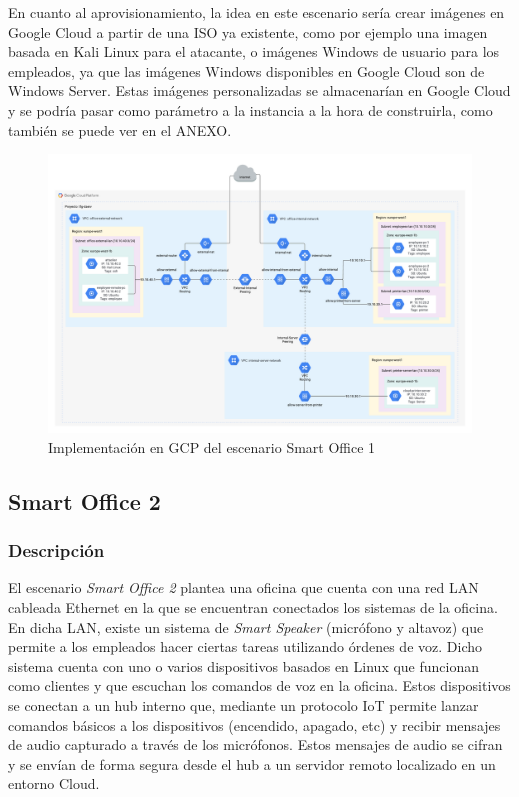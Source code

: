   En cuanto al aprovisionamiento, la idea en este escenario sería crear imágenes en Google Cloud a partir de una ISO ya existente, como por ejemplo una imagen basada en Kali Linux para el atacante, o imágenes Windows de usuario para los empleados, ya que las imágenes Windows disponibles en Google Cloud son de Windows Server. Estas imágenes personalizadas se almacenarían en Google Cloud y se podría pasar como parámetro a la instancia a la hora de construirla, como también se puede ver en el ANEXO.

  \clearpage
  \begin{figure}[h]
  \centering
  \includegraphics[width=1.45\textwidth, angle=270]{../imgs/desarrollo/escenarios-de-red/smart-office-1/EscenarioSmartOffice1V2.png}
  \caption{Implementación en GCP del escenario Smart Office 1}
  \label{fig:so1-i}
  \end{figure}
  \clearpage 

\subsection{Smart Office 2} \label{sec:so2}
\subsubsection{Descripción}
  El escenario \textit{Smart Office 2} plantea una oficina que cuenta con una red LAN cableada Ethernet en la que se encuentran conectados los sistemas de la oficina. En dicha LAN, existe un sistema de \textit{Smart Speaker} (micrófono y altavoz) que permite a los empleados hacer ciertas tareas utilizando órdenes de voz. Dicho sistema cuenta con uno o varios dispositivos basados en Linux que funcionan como clientes y que escuchan los comandos de voz en la oficina. Estos dispositivos se conectan a un hub interno que, mediante un protocolo IoT permite lanzar comandos básicos a los dispositivos (encendido, apagado, etc) y recibir mensajes de audio capturado a través de los micrófonos. Estos mensajes de audio se cifran y se envían de forma segura desde el hub a un servidor remoto localizado en un entorno Cloud.

